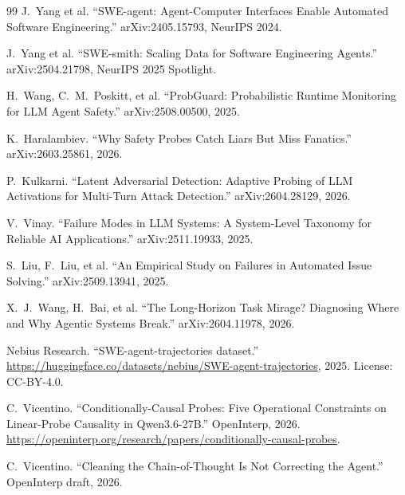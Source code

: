 \documentclass[11pt]{article}
\begin{document}
\begin{thebibliography}{99}
J.~Yang et al.
``SWE-agent: Agent-Computer Interfaces Enable Automated Software Engineering.'' arXiv:2405.15793, NeurIPS 2024.

J.~Yang et al.
``SWE-smith: Scaling Data for Software Engineering Agents.'' arXiv:2504.21798, NeurIPS 2025 Spotlight.

H.~Wang, C.~M.~Poskitt, et al.
``ProbGuard: Probabilistic Runtime Monitoring for LLM Agent Safety.'' arXiv:2508.00500, 2025.

K.~Haralambiev.
``Why Safety Probes Catch Liars But Miss Fanatics.'' arXiv:2603.25861, 2026.

P.~Kulkarni.
``Latent Adversarial Detection: Adaptive Probing of LLM Activations for Multi-Turn Attack Detection.'' arXiv:2604.28129, 2026.

V.~Vinay.
``Failure Modes in LLM Systems: A System-Level Taxonomy for Reliable AI Applications.'' arXiv:2511.19933, 2025.

S.~Liu, F.~Liu, et al.
``An Empirical Study on Failures in Automated Issue Solving.'' arXiv:2509.13941, 2025.

X.~J.~Wang, H.~Bai, et al.
``The Long-Horizon Task Mirage? Diagnosing Where and Why Agentic Systems Break.'' arXiv:2604.11978, 2026.

Nebius Research.
``SWE-agent-trajectories dataset.''
\url{https://huggingface.co/datasets/nebius/SWE-agent-trajectories}, 2025. License: CC-BY-4.0.

C.~Vicentino.
``Conditionally-Causal Probes: Five Operational Constraints on Linear-Probe Causality in Qwen3.6-27B.'' OpenInterp, 2026.
\url{https://openinterp.org/research/papers/conditionally-causal-probes}.

C.~Vicentino.
``Cleaning the Chain-of-Thought Is Not Correcting the Agent.'' OpenInterp draft, 2026.

\end{thebibliography}
\end{document}
